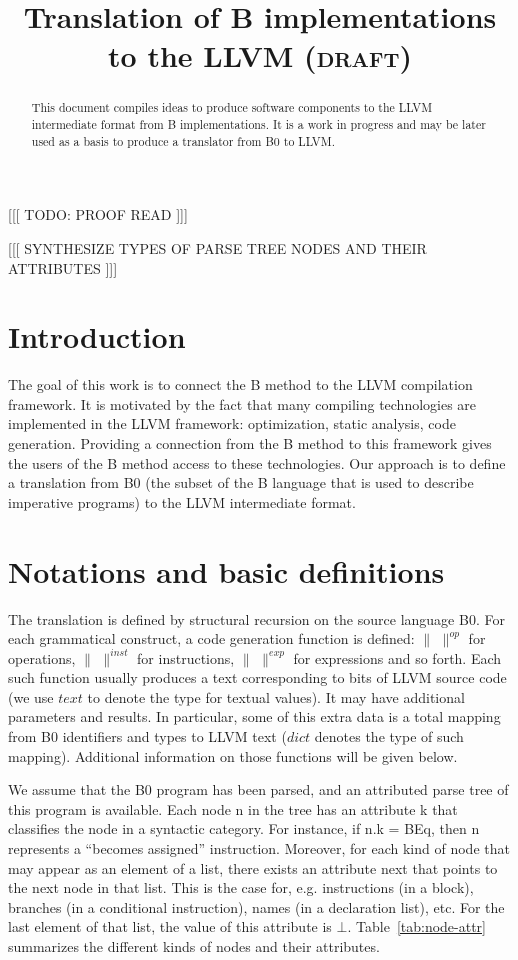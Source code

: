 \documentclass{article}
\title{Translation of B implementations to the LLVM (\textsc{draft})}
\author{} \date{}
\newcommand{\trad}[2]{\ensuremath{\lVert \textsf{#1} \rVert^{\textit{#2}}}}
\begin{document}
\maketitle

\begin{abstract}
  This document compiles ideas to produce software components to the
  LLVM intermediate format from B implementations. It is a work in
  progress and may be later used as a basis to produce a translator
  from B0 to LLVM.
\end{abstract}

[[[ TODO: PROOF READ ]]]

[[[ SYNTHESIZE TYPES OF PARSE TREE NODES AND THEIR ATTRIBUTES ]]] 

\tableofcontents

\section{Introduction}
\label{sec:intro}

The goal of this work is to connect the B method to the LLVM
compilation framework. It is motivated by the fact that many compiling
technologies are implemented in the LLVM framework: optimization,
static analysis, code generation. Providing a connection from the B
method to this framework gives the users of the B method access to
these technologies. Our approach is to define a translation from B0
(the subset of the B language that is used to describe imperative
programs) to the LLVM intermediate format.

\section{Notations and basic definitions}
\label{sec:notations}

The translation is defined by structural recursion on the source
language B0. For each grammatical construct, a code generation
function is defined: $\trad{~}{op}$ for operations, $\trad{~}{inst}$
for instructions, $\trad{~}{exp}$ for expressions and so forth. Each
such function usually produces a text corresponding to bits of LLVM
source code (we use $text$ to denote the type for textual values). It
may have additional parameters and results. In particular, some of
this extra data is a total mapping from B0 identifiers and types to
LLVM text ($dict$ denotes the type of such mapping). Additional
information on those functions will be given below.

We assume that the B0 program has been parsed, and an attributed parse
tree of this program is available. Each node \textsf{n} in the tree
has an attribute \textsf{k} that classifies the node in a syntactic
category. For instance, if \textsf{n.k = BEq}, then \textsf{n}
represents a ``becomes assigned'' instruction. Moreover, for each kind
of node that may appear as an element of a list, there exists an
attribute \textsf{next} that points to the next node in that
list. This is the case for, e.g. instructions (in a block), branches
(in a conditional instruction), names (in a declaration list), etc.
For the last element of that list, the value of this attribute is
$\bot$. Table~\ref{tab:node-attr} summarizes the different kinds of
nodes and their attributes.
\end{document}
